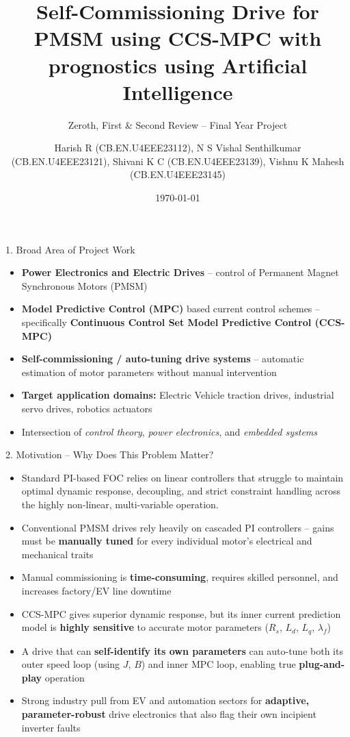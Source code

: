 \documentclass[aspectratio=169]{beamer}
\title[Project Review]{\textbf{Self-Commissioning Drive for PMSM using CCS-MPC with prognostics using Artificial Intelligence}}
\subtitle{Zeroth, First \& Second Review -- Final Year Project}
\author{Harish R (CB.EN.U4EEE23112), N S Vishal Senthilkumar (CB.EN.U4EEE23121), Shivani K C (CB.EN.U4EEE23139), Vishnu K Mahesh (CB.EN.U4EEE23145)}
\institute[ASE, Amrita]{
    Department of Electrical and Electronics Engineering \\
    Amrita School of Engineering, Coimbatore \\
    Amrita Vishwa Vidyapeetham \\[4pt]
    \textit{Guide:} Dr. Umashankar Subramaniam
}
\date{\today}
\begin{document}
\begin{frame}
    \titlepage
\end{frame}


\begin{frame}{1. Broad Area of Project Work}
    \begin{itemize}
        \item \textbf{Power Electronics and Electric Drives} -- control of Permanent Magnet Synchronous Motors (PMSM)
        \item \textbf{Model Predictive Control (MPC)} based current control schemes -- specifically \textbf{Continuous Control Set Model Predictive Control (CCS-MPC)}
        \item \textbf{Self-commissioning / auto-tuning drive systems} -- automatic estimation of motor parameters without manual intervention
        \item \textbf{Target application domains:} Electric Vehicle traction drives, industrial servo drives, robotics actuators
        \item Intersection of \textit{control theory}, \textit{power electronics}, and \textit{embedded systems}
    \end{itemize}
\end{frame}

\begin{frame}{2. Motivation -- Why Does This Problem Matter?}
    \begin{itemize}
        \item Standard PI-based FOC relies on linear controllers that struggle to maintain optimal dynamic response, decoupling, and strict constraint handling across the highly non-linear, multi-variable operation.
        \item Conventional PMSM drives rely heavily on cascaded PI controllers -- gains must be \textbf{manually tuned} for every individual motor's electrical and mechanical traits
        \item Manual commissioning is \textbf{time-consuming}, requires skilled personnel, and increases factory/EV line downtime
        \item CCS-MPC gives superior dynamic response, but its inner current prediction model is \textbf{highly sensitive} to accurate motor parameters ($R_s$, $L_d$, $L_q$, $\lambda_f$)
        \item A drive that can \textbf{self-identify its own parameters} can auto-tune both its outer speed loop (using $J$, $B$) and inner MPC loop, enabling true \textbf{plug-and-play} operation
        \item Strong industry pull from EV and automation sectors for \textbf{adaptive, parameter-robust} drive electronics that also flag their own incipient inverter faults
    \end{itemize}
\end{frame}
\end{document}
